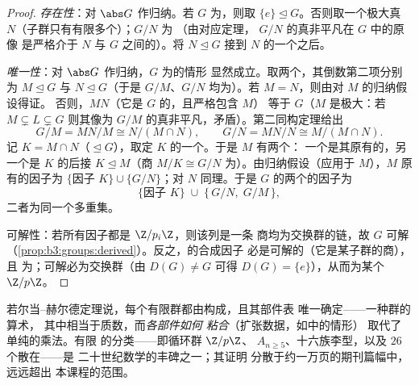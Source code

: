 \begin{proof}
\emph{存在性}：对 $\abs G$ 作归纳。若 $G$ 为，则取
$\{e\} \trianglelefteq G$。否则取一个极大真
$N$（子群只有有限多个）；$G/N$ 为
（由对应定理，
$G/N$ 的真非平凡在 $G$ 中的原像
是严格介于 $N$ 与 $G$ 之间的）。将 $N \trianglelefteq G$ 接到
$N$ 的一个之后。

\emph{唯一性}：对 $\abs G$ 作归纳，$G$ 为的情形
显然成立。取两个，其倒数第二项分别为
$M \trianglelefteq G$ 与 $N \trianglelefteq G$（于是 $G/M$、$G/N$
均为）。若 $M = N$，则由对 $M$ 的归纳假设得证。
否则，$MN$（它是 $G$ 的，且严格包含 $M$）
等于 $G$（$M$ 是极大：若 $M \subsetneq L
\subsetneq G$ 则其像为
 $G/M$ 的真非平凡，矛盾）。第二同构定理给出
\[
G/M = MN/M \cong N/(M \cap N),
\qquad
G/N = MN/N \cong M/(M \cap N).
\]
记 $K = M \cap N$（$\trianglelefteq G$），取定
$K$ 的一个。于是 $M$ 有两个：
一个是其原有的，另一个是 $K$ 的后接 $K \trianglelefteq
M$（商 $M/K \cong G/N$ 为）。由归纳假设（应用于
$M$），$M$ 原有的因子为
$\{\text{因子 } K\} \cup \{G/N\}$；对 $N$ 同理。于是
$G$ 的两个的因子为
\[
\{\text{因子 } K\} \;\cup\; \{\,G/N,\; G/M\,\},
\]
二者为同一个多重集。

可解性：若所有因子都是 $\Z/p_i\Z$，则该列是一条
商均为交换群的链，故 $G$ 可解
（\cref{prop:b3:groups:derived}）。反之，的合成因子
必是可解的（它是某子群的商），且
为；可解必为交换群（由 $D(G) \ne G$ 可得
$D(G) = \{e\}$），从而为某个 $\Z/p\Z$。
\end{proof}

\begin{remark}\label{rem:b3:groups:jhmeaning}
若尔当–赫尔德定理说，每个有限群都由构成，且其部件表
唯一确定——一种群的算术，
其中相当于质数，而\emph{各部件如何
粘合}（扩张数据，如中的情形）
取代了单纯的乘法。有限
的分类——即循环群 $\Z/p\Z$、 $A_{n \geq
5}$、十六族李型，以及 $26$ 个散在——是
二十世纪数学的丰碑之一；其证明
分散于约一万页的期刊篇幅中，远远超出
本课程的范围。
\end{remark}

